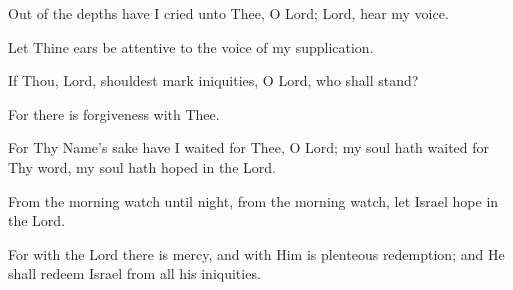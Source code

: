 Out of the depths have I cried unto Thee, O Lord; Lord, hear my voice.

Let Thine ears be attentive to the voice of my supplication.

If Thou, Lord, shouldest mark iniquities, O Lord, who shall stand?

For there is forgiveness with Thee.

For Thy Name's sake have I waited for Thee, O Lord; my soul hath waited for Thy word, my soul hath hoped in the Lord.

From the morning watch until night, from the morning watch, let Israel hope in the Lord.

For with the Lord there is mercy, and with Him is plenteous redemption; and He shall redeem Israel from all his iniquities.
